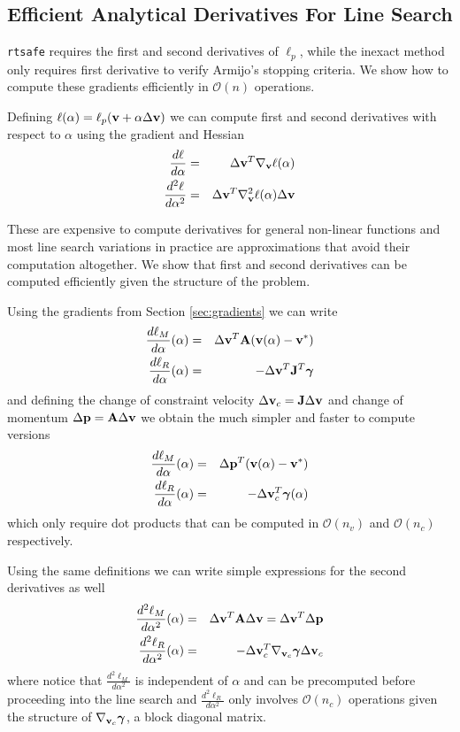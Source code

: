 \subsection{Efficient Analytical Derivatives For Line Search}

\verb;rtsafe; requires the first and second derivatives of
$\ell_p$, while the inexact method only requires first derivative to verify
Armijo's stopping criteria. We show how to compute these gradients efficiently
in $\mathcal{O}(n)$ operations.

Defining $\ell(\alpha) = \ell_p({\mathbf{v}}+\alpha\Delta{\mathbf{v}})$ we can
compute first and second derivatives with respect to $\alpha$ using the gradient
and Hessian
\begin{eqnarray}
	\frac{d\ell}{d\alpha}&=&\Delta{\mathbf{v}}^T\nabla_{\mathbf{v}}\ell(\alpha)\nonumber\\
	\frac{d^2\ell}{d\alpha^2}&=&\Delta{\mathbf{v}}^T\nabla_{\mathbf{v}}^2\ell(\alpha)\Delta{\mathbf{v}}\nonumber
\end{eqnarray}

These are expensive to compute derivatives for general non-linear functions and
most line search variations in practice are approximations that avoid their
computation altogether. We show that first and second derivatives can be
computed efficiently given the structure of the problem.

Using the gradients from Section \ref{sec:gradients} we can write
\begin{eqnarray}
	\frac{d\ell_M}{d\alpha}(\alpha)&=&\Delta{\mathbf{v}}^T{\mathbf{A}}({\mathbf{v}}(\alpha)-{\mathbf{v}}^*)\\
	\frac{d\ell_R}{d\alpha}(\alpha)&=&-\Delta{\mathbf{v}}^T{\mathbf{J}}^T{\bm\gamma}
\end{eqnarray}
and defining the change of constraint velocity
$\Delta{\mathbf{v}}_c={\mathbf{J}}\Delta{\mathbf{v}}$ and change of momentum $\Delta{\mathbf{p}} =
{\mathbf{A}}\Delta{\mathbf{v}}$ we obtain the much simpler and faster to compute versions
\begin{eqnarray}
	\frac{d\ell_M}{d\alpha}(\alpha)&=&\Delta{\mathbf{p}}^T({\mathbf{v}}(\alpha)-{\mathbf{v}}^*)\\
	\frac{d\ell_R}{d\alpha}(\alpha)&=&-\Delta{\mathbf{v}}_c^T{\bm\gamma}(\alpha)
\end{eqnarray}
which only require dot products that can be computed in $\mathcal{O}(n_v)$ and
$\mathcal{O}(n_c)$ respectively.

Using the same definitions we can write simple expressions for the second
derivatives as well
\begin{eqnarray}
	\frac{d^2\ell_M}{d\alpha^2}(\alpha)&=&\Delta{\mathbf{v}}^T{\mathbf{A}}\Delta{\mathbf{v}}=\Delta{\mathbf{v}}^T\Delta{\mathbf{p}}\\
	\frac{d^2\ell_R}{d\alpha^2}(\alpha)&=&-\Delta{\mathbf{v}}_c^T
	\nabla_{{\mathbf{v}}_c}{\bm\gamma}\Delta{\mathbf{v}}_c
\end{eqnarray}
where notice that $\frac{d^2\ell_M}{d\alpha^2}$ is independent of $\alpha$ and
can be precomputed before proceeding into the line search and
$\frac{d^2\ell_R}{d\alpha^2}$ only involves $\mathcal{O}(n_c)$ operations given
the structure of $\nabla_{{\mathbf{v}}_c}{\bm\gamma}$, a block diagonal matrix.


